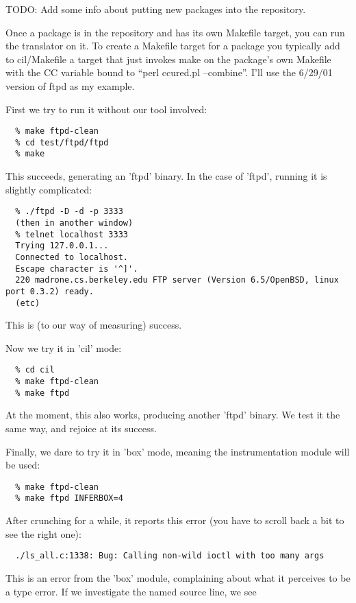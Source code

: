 \documentclass{book}
\begin{document}
TODO: Add some info about putting new packages into the repository.

Once a package is in the repository and has its own Makefile target, you can
run the translator on it. To create a Makefile target for a package you
typically add to cil/Makefile a target that just invokes make on the package's
own Makefile with the CC variable bound to ``perl ccured.pl --combine''. I'll
use the 6/29/01 version of ftpd as my example.

First we try to run it without our tool involved:

\begin{verbatim}
  % make ftpd-clean
  % cd test/ftpd/ftpd
  % make
\end{verbatim}
  
This succeeds, generating an 'ftpd' binary.  In the case of 'ftpd', 
running it is slightly complicated:

\begin{verbatim}
  % ./ftpd -D -d -p 3333
  (then in another window)
  % telnet localhost 3333
  Trying 127.0.0.1...
  Connected to localhost.
  Escape character is '^]'.
  220 madrone.cs.berkeley.edu FTP server (Version 6.5/OpenBSD, linux port 0.3.2) ready.
  (etc)
\end{verbatim}
  
This is (to our way of measuring) success.

Now we try it in 'cil' mode:

\begin{verbatim}
  % cd cil
  % make ftpd-clean
  % make ftpd
\end{verbatim}
  
At the moment, this also works, producing another 'ftpd' binary.  We test
it the same way, and rejoice at its success.

Finally, we dare to try it in 'box' mode, meaning the instrumentation
module will be used:

\begin{verbatim}
  % make ftpd-clean
  % make ftpd INFERBOX=4
\end{verbatim}
  
After crunching for a while, it reports this error (you have to scroll
back a bit to see the right one):

\begin{verbatim}
  ./ls_all.c:1338: Bug: Calling non-wild ioctl with too many args
\end{verbatim}

This is an error from the 'box' module, complaining about what it
perceives to be a type error.  If we investigate the named source
line, we see
\end{document}
